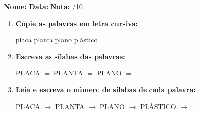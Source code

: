 \begin{exercicio}



\noindent\textbf{Nome:} \underline{\hspace{3.2cm}} \quad \textbf{Data:} \underline{\hspace{1.6cm}} \quad \textbf{Nota:} \underline{\hspace{0.9cm}}/10


\begin{enumerate}

  \item \textbf{Copie as palavras em letra cursiva:}
  \begin{center}
  placa \quad planta \quad plano \quad plástico
  \end{center}
  \begin{center}
  \underline{\hspace{2.4cm}} \quad \underline{\hspace{2.4cm}} \quad \underline{\hspace{2.4cm}} \quad \underline{\hspace{2.4cm}}
  \end{center}

  \item \textbf{Escreva as sílabas das palavras:}
  \begin{center}
  PLACA $=$ \underline{\hspace{1.5cm}} \underline{\hspace{1.5cm}} \quad PLANTA $=$ \underline{\hspace{1.5cm}} \underline{\hspace{1.5cm}} \quad PLANO $=$ \underline{\hspace{1.5cm}} \underline{\hspace{1.5cm}}
  \end{center}

  \item \textbf{Leia e escreva o número de sílabas de cada palavra:}
  \begin{center}
  PLACA $\rightarrow$ \underline{\hspace{0.9cm}} \quad PLANTA $\rightarrow$ \underline{\hspace{0.9cm}} \quad PLANO $\rightarrow$ \underline{\hspace{0.9cm}} \quad PLÁSTICO $\rightarrow$ \underline{\hspace{0.9cm}}
  \end{center}


\end{enumerate}
\end{exercicio}
